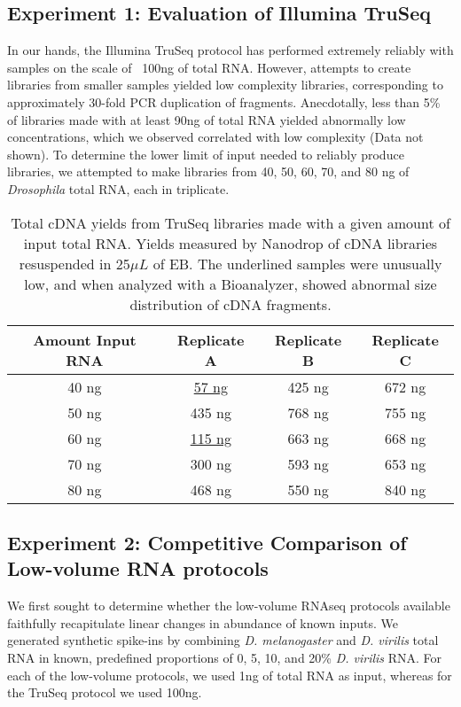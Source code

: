 \documentclass[12pt]{article}
\begin{document}
\subsection{Experiment 1: Evaluation of Illumina TruSeq}

In our hands, the Illumina TruSeq protocol has performed extremely reliably with samples on the scale of ~100ng of total RNA.  However, attempts to create libraries from smaller samples yielded low complexity libraries, corresponding to approximately 30-fold PCR duplication of fragments. Anecdotally, less than 5\% of libraries made with at least 90ng of total RNA yielded abnormally low concentrations, which we observed correlated with low complexity (Data not shown). To determine the lower limit of input needed to reliably produce libraries, we attempted to make libraries from 40, 50, 60, 70, and 80 ng of {\em Drosophila} total RNA, each in triplicate.

\begin{table}[htdp]
\caption{Total cDNA yields from TruSeq libraries made with a given amount of input total RNA.  Yields measured by Nanodrop of cDNA libraries resuspended in 25$\mu L$ of EB. The underlined samples were unusually low, and when analyzed with a Bioanalyzer, showed abnormal size distribution of cDNA fragments.}
\begin{center}
\begin{tabular}{|c|c|c|c|}\hline
Amount Input RNA & Replicate A & Replicate B & Replicate C\\\hline
40 ng & \underline{ 57 ng}  & 425 ng & 672 ng\\
50 ng & 435 ng & 768 ng & 755 ng\\
60 ng & \underline{ 115 ng} & 663 ng & 668 ng\\
70 ng & 300 ng & 593 ng & 653 ng\\
80 ng & 468 ng & 550 ng & 840 ng\\\hline
\end{tabular}
\end{center}
\label{table:truseqtitration}
\end{table}



 

\subsection{Experiment 2: Competitive Comparison of Low-volume RNA protocols}

We first sought to determine whether the low-volume RNAseq protocols available faithfully recapitulate linear changes in abundance of known inputs. We generated synthetic spike-ins by combining {\em D. melanogaster} and {\em D. virilis} total RNA in known, predefined proportions of 0, 5, 10, and 20\% {\em D. virilis} RNA. For each of the low-volume protocols, we used 1ng of total RNA as input, whereas for the TruSeq protocol we used 100ng.
\end{document}
